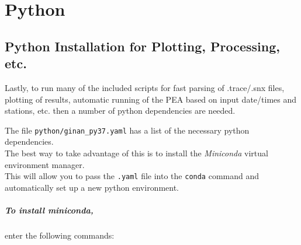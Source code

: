 %
%
%
%
%
%
%

\chapter{Python}
\section{Python Installation for Plotting, Processing,
etc.}\label{python-installation-for-plotting-processing-etc.}

Lastly, to run many of the included scripts for fast parsing of
.trace/.snx files, plotting of results, automatic running of the PEA
based on input date/times and stations, etc. then a number of python
dependencies are needed.

The file \texttt{python/ginan\_py37.yaml} has a list of the necessary
python dependencies.\\
The best way to take advantage of this is to install the
\emph{\emph{Miniconda}} virtual environment manager.\\
This will allow you to pass the \texttt{.yaml} file into the
\texttt{conda} command and automatically set up a new python
environment.

\paragraph{To install miniconda,}enter the following commands:

